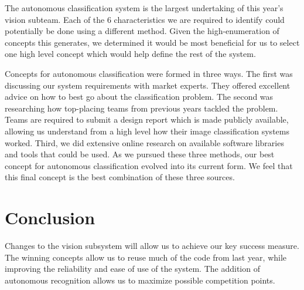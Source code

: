 \documentclass[]{auvsi_doc}
\begin{document}
The autonomous classification system is the largest undertaking of this year's vision subteam. Each of the 6 characteristics we are 
required to identify could potentially be done using a different method. Given the high-enumeration of concepts this generates, we 
determined it would be most beneficial for us to select one high level concept which would help define the rest of the system.

Concepts for autonomous classification were formed in three ways. The first was discussing our system requirements with market experts. 
They offered excellent advice on how to best go about the classification problem. The second was researching how top-placing teams from 
previous years tackled the problem. Teams are required to submit a design report which is made publicly available, allowing us understand 
from a high level how their image classification systems worked. Third, we did extensive online research on available software libraries 
and tools that could be used. As we pursued these three methods, our best concept for autonomous classification evolved into its current 
form. We feel that this final concept is the best combination of these three sources.

\section{Conclusion}

Changes to the vision subsystem will allow us to achieve our key success measure. The winning concepts allow us to reuse much of the 
code from last year, while improving the reliability and ease of use of the system. The addition of autonomous recognition allows 
us to maximize possible competition points.
\end{document}
